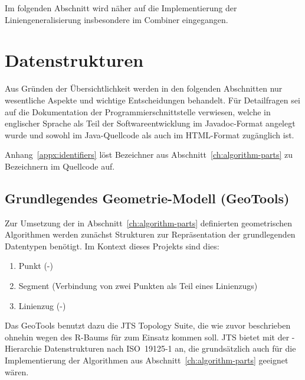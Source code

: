 \documentclass[../main/thesis.tex]{subfiles}
\begin{document}

Im folgenden Abschnitt wird näher auf die Implementierung der Liniengeneralisierung insbesondere im Combiner eingegangen.



\section{Datenstrukturen}
\label{ch:data-structures}


Aus Gründen der Übersichtlichkeit werden in den folgenden Abschnitten nur wesentliche Aspekte und wichtige Entscheidungen behandelt.
Für Detailfragen sei auf die Dokumentation der Programmierschnittstelle verwiesen, welche in englischer Sprache als Teil der Softwareentwicklung im Javadoc-Format angelegt wurde und sowohl im Java-Quellcode als auch im HTML-Format zugänglich ist.

Anhang~\ref{appx:identifiers} löst Bezeichner aus Abschnitt~\ref{ch:algorithm-parts} zu Bezeichnern im Quellcode auf.



\subsection{Grundlegendes Geometrie-Modell (GeoTools)}
\label{ch:data-structures-geotools}

Zur Umsetzung der in Abschnitt~\ref{ch:algorithm-parts} definierten geometrischen Algorithmen werden zunächst Strukturen zur Repräsentation der grundlegenden Datentypen benötigt.
Im Kontext dieses Projekts sind dies:
\begin{enumerate}[nosep]
	\item Punkt (\osm-)
	\item Segment (Verbindung von zwei Punkten als Teil eines Linienzugs)
	\item Linienzug (\osm-)
\end{enumerate}

\noindent
Das  GeoTools benutzt dazu die JTS Topology Suite, die wie zuvor beschrieben ohnehin wegen des R-Baums für  zum Einsatz kommen soll.
JTS bietet mit der -Hierarchie Datenstrukturen nach ISO~19125\hbox{-}1 an, die grundsätzlich auch für die Implementierung der Algorithmen aus Abschnitt~\ref{ch:algorithm-parts} geeignet wären.
\end{document}
